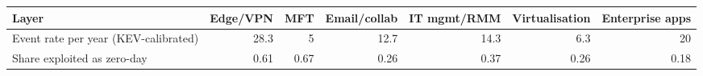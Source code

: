 \begin{tabular}{lrrrrrr}
\toprule
Layer & Edge/VPN & MFT & Email/collab & IT mgmt/RMM & Virtualisation & Enterprise apps \\
\midrule
Event rate per year (KEV-calibrated) & 28.3 & 5 & 12.7 & 14.3 & 6.3 & 20 \\
Share exploited as zero-day & 0.61 & 0.67 & 0.26 & 0.37 & 0.26 & 0.18 \\
\bottomrule
\end{tabular}
